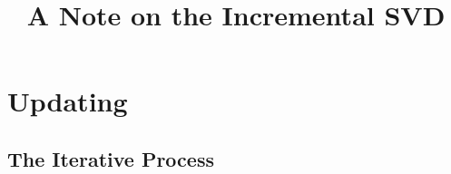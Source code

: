 \documentclass[11pt,a4paper]{article}
\newcommand{\0}{\M{0}}
\newenvironment{changemargin}[2]{%
  \begin{list}{}{%
      \setlength{\topsep}{0pt}%
      \setlength{\leftmargin}{#1}%
      \setlength{\rightmargin}{#2}%
      \setlength{\listparindent}{\parindent}%
      \setlength{\itemindent}{\parindent}%
      \setlength{\parsep}{\parskip}%
    }%
  \item[]}
  {\end{list}}
\newenvironment{keywords}{%
  \begingroup
  \def\and{\unskip\space\textperiodcentered\space\ignorespaces}
  \begin{changemargin}{\leftmargin}{\leftmargin}
    \small\noindent\emph{Keywords}:}
  {\end{changemargin}
  \endgroup
}
\begin{document}
\title{A Note on the Incremental SVD}

\date{}

\author{}


\maketitle





\section{Updating}

\subsection{The Iterative Process}
\end{document}
